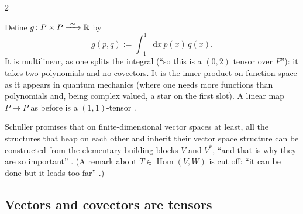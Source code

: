 \begin{paracol}{2}
\begin{example}\label{ex:c03-ip}
Define $g\colon P\times P\xrightarrow{\ \sim\ }\mathbb{R}$ by
\[
  g(p,q):=\int_{-1}^{1}\mathrm dx\,p(x)\,q(x).
\]
It is multilinear, as one splits the integral (``so this is a $(0,2)$ tensor over $P$''): it takes two polynomials and no covectors. It is the inner product on function space as it appears in quantum mechanics (where one needs more functions than polynomials and, being complex valued, a star on the first slot).
A linear map $P\to P$ as before is a $(1,1)$-tensor .
\end{example}
Schuller promises that on finite-dimensional vector spaces at least, all the structures that heap on each other and inherit their vector space structure can be constructed from the elementary building blocks $V$ and $V^*$, ``and that is why they are so important''
. (A remark about $T\in\operatorname{Hom}(V,W)$ is cut off: ``it can be done but it leads too far'' .)

\subsection{Vectors and covectors are tensors}


\end{paracol}
